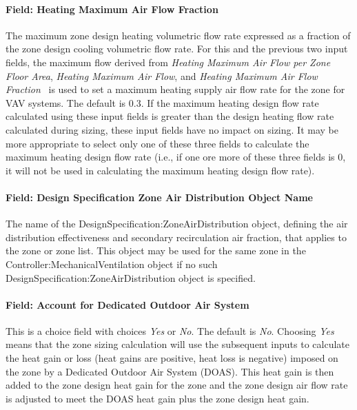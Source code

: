 \paragraph{Field: Heating Maximum Air Flow Fraction}\label{field-heating-maximum-air-flow-fraction}

The maximum zone design heating volumetric flow rate expressed as a fraction of the zone design cooling volumetric flow rate. For this and the previous two input fields, the maximum flow derived from \emph{Heating Maximum Air Flow per Zone Floor Area}, \emph{Heating Maximum Air Flow}, and \emph{Heating Maximum Air Flow Fraction}~ is used to set a maximum heating supply air flow rate for the zone for VAV systems. The default is 0.3. If the maximum heating design flow rate calculated using these input fields is greater than the design heating flow rate calculated during sizing, these input fields have no impact on sizing. It may be more appropriate to select only one of these three fields to calculate the maximum heating design flow rate (i.e., if one ore more of these three fields is 0, it will not be used in calculating the maximum heating design flow rate).

\paragraph{Field: Design Specification Zone Air Distribution Object Name}\label{field-design-specification-zone-air-distribution-object-name}

The name of the DesignSpecification:ZoneAirDistribution object, defining the air distribution effectiveness and secondary recirculation air fraction, that applies to the zone or zone list. This object may be used for the same zone in the Controller:MechanicalVentilation object if no such DesignSpecification:ZoneAirDistribution object is specified.

\paragraph{Field: Account for Dedicated Outdoor Air System}\label{field-account-for-dedicated-outdoor-air-system}

This is a choice field with choices \emph{Yes} or \emph{No}. The default is \emph{No}. Choosing \emph{Yes} means that the zone sizing calculation will use the subsequent inputs to calculate the heat gain or loss (heat gains are positive, heat loss is negative) imposed on the zone by a Dedicated Outdoor Air System (DOAS). This heat gain is then added to the zone design heat gain for the zone and the zone design air flow rate is adjusted to meet the DOAS heat gain plus the zone design heat gain.

